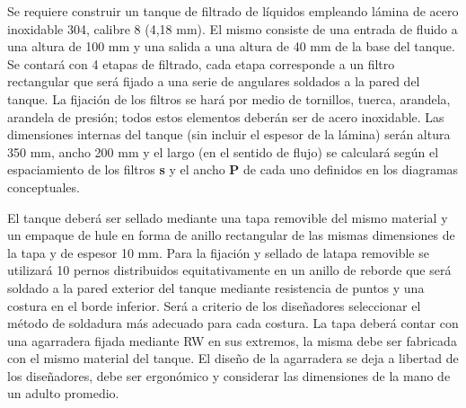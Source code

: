 \documentclass[10pt]{article}
\begin{document}
Se requiere construir un tanque de filtrado de líquidos empleando lámina de acero inoxidable 304, calibre 8 (4,18 mm). El mismo consiste de una entrada de fluido a una altura de 100 mm y una salida 
a una altura de 40 mm de la base del tanque. Se contará con 4 etapas de filtrado, cada etapa corresponde a un filtro rectangular que será fijado a una serie de angulares soldados a la
pared del tanque. La fijación de los filtros se hará por medio de tornillos, tuerca, arandela, arandela de presión; todos estos elementos deberán ser de acero inoxidable. Las dimensiones
internas del tanque (sin incluir el espesor de la lámina) serán altura 350 mm, ancho 200 mm y el largo (en el sentido de flujo) se calculará según el espaciamiento de los filtros \textbf{s} y el ancho \textbf{P} de cada uno
definidos en los diagramas conceptuales.

El tanque deberá ser sellado mediante una tapa removible del mismo material y un empaque de hule en forma de anillo rectangular de las mismas dimensiones de la tapa y de espesor 10 mm. Para la 
fijación y sellado de latapa removible se utilizará 10 pernos distribuidos equitativamente en un anillo de reborde que será soldado a la pared exterior del tanque mediante resistencia de puntos 
y una costura en el borde inferior. Será a criterio de los diseñadores seleccionar el método de soldadura más adecuado para cada costura. La tapa deberá contar con una agarradera fijada
mediante RW en sus extremos, la misma debe ser fabricada con el mismo material del tanque. El diseño de la agarradera se deja a libertad de los diseñadores, debe ser ergonómico y considerar las dimensiones 
de la mano de un adulto promedio. 
\end{document}
